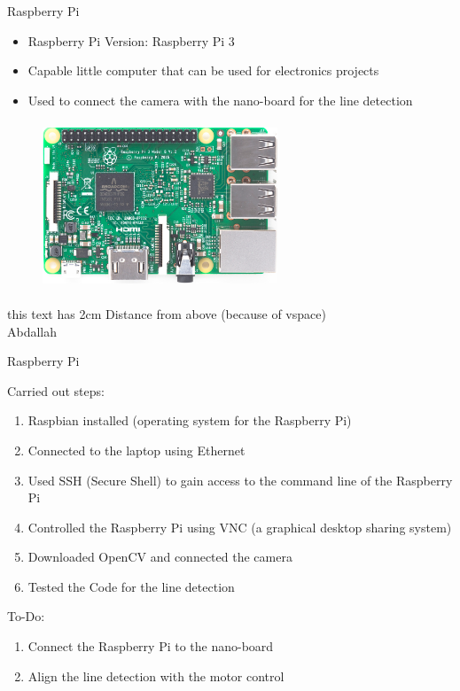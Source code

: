  
\begin{frame}[plain]{Raspberry Pi}
	\begin{itemize}
		\item Raspberry Pi Version: Raspberry Pi 3
		\item Capable little computer that can be used for electronics projects
		\item Used to connect the camera with the nano-board for the line detection
	\end{itemize}
	
	\begin{figure}
	\includegraphics[width=7cm, height=5cm]{raspi.png}
	\end{figure}
	
	\vspace{2cm}
	this text has 2cm Distance from above (because of vspace)\\ %
	Abdallah
\end{frame}

\begin{frame}[plain]{Raspberry Pi}

Carried out steps:
\begin{enumerate}
		\item Raspbian installed (operating system for the Raspberry Pi)
		\item Connected to the laptop using Ethernet
		\item Used SSH (Secure Shell) to gain access to the command line of the Raspberry Pi
		\item Controlled the Raspberry Pi using VNC (a graphical desktop sharing system)
		\item Downloaded OpenCV and connected the camera
		\item Tested the Code for the line detection
	\end{enumerate}
	

	
To-Do:
\begin{enumerate}
		\item Connect the Raspberry Pi to the nano-board
		\item Align the line detection with the motor control
	\end{enumerate}

\end{frame}

